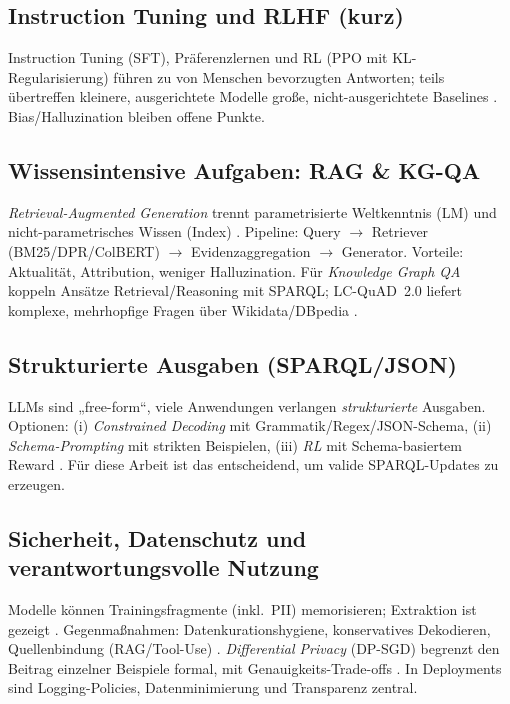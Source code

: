 \subsection{Instruction Tuning und RLHF (kurz)}
Instruction Tuning (SFT), Präferenzlernen und RL (PPO mit KL-Regularisierung) führen zu von Menschen bevorzugten Antworten; teils übertreffen kleinere, ausgerichtete Modelle große, nicht-ausgerichtete Baselines \cite{ouyang2022training}. Bias/Halluzination bleiben offene Punkte.

\subsection{Wissensintensive Aufgaben: RAG \& KG-QA}
\emph{Retrieval-Augmented Generation} trennt parametrisierte Weltkenntnis (LM) und nicht-parametrisches Wissen (Index) \cite{lewis2020rag}. Pipeline: Query $\rightarrow$ Retriever (BM25/DPR/ColBERT) $\rightarrow$ Evidenzaggregation $\rightarrow$ Generator. Vorteile: Aktualität, Attribution, weniger Halluzination. Für \emph{Knowledge Graph QA} koppeln Ansätze Retrieval/Reasoning mit SPARQL; LC-QuAD~2.0 liefert komplexe, mehrhopfige Fragen über Wikidata/DBpedia \cite{dubey2019lcquad2}.

\subsection{Strukturierte Ausgaben (SPARQL/JSON)}
LLMs sind „free-form“, viele Anwendungen verlangen \emph{strukturierte} Ausgaben. Optionen: (i) \emph{Constrained Decoding} mit Grammatik/Regex/JSON-Schema, (ii) \emph{Schema-Prompting} mit strikten Beispielen, (iii) \emph{RL} mit Schema-basiertem Reward \cite{cong2023schema}. Für diese Arbeit ist das entscheidend, um valide SPARQL-Updates zu erzeugen.

\subsection{Sicherheit, Datenschutz und verantwortungsvolle Nutzung}
Modelle können Trainingsfragmente (inkl.\ PII) memorisieren; Extraktion ist gezeigt \cite{carlini2021extracting}. Gegenmaßnahmen: Datenkurationshygiene, konservatives Dekodieren, Quellenbindung (RAG/Tool-Use) \cite{lewis2020rag,yao2023react}. \emph{Differential Privacy} (DP-SGD) begrenzt den Beitrag einzelner Beispiele formal, mit Genauigkeits-Trade-offs \cite{abadi2016deep}. In Deployments sind Logging-Policies, Datenminimierung und Transparenz zentral.

